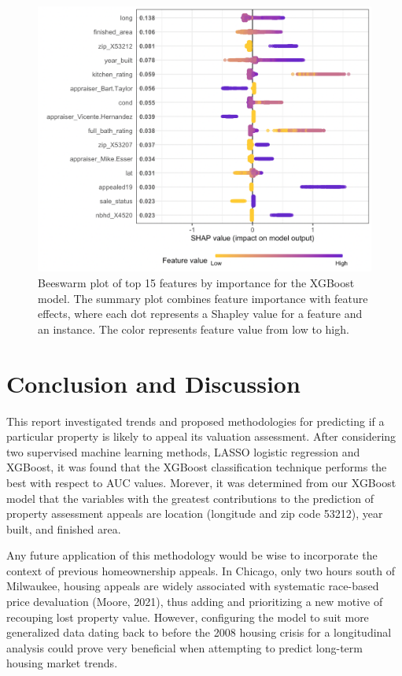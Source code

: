 \documentclass[
  12pt,
]{article}
\begin{document}
\begin{figure}[H]

{\centering \includegraphics[width=0.72\linewidth]{shapbees} 

}

\caption{Beeswarm plot of top 15 features by importance for the XGBoost model. The summary plot combines feature importance with feature effects, where each dot represents a Shapley value for a feature and an instance. The color represents feature value from low to high.}\label{fig:unnamed-chunk-9}
\end{figure}

\hypertarget{conclusion-and-discussion}{%
\section{Conclusion and Discussion}\label{conclusion-and-discussion}}

This report investigated trends and proposed methodologies for
predicting if a particular property is likely to appeal its valuation
assessment. After considering two supervised machine learning methods, LASSO logistic regression and XGBoost,
it was found that the XGBoost classification
technique performs the best with respect to AUC values. Morever, it was determined from our XGBoost model that 
the variables with the greatest contributions to the prediction of property assessment appeals are location (longitude and zip code 53212), year built, and finished area.

Any future application of this methodology would be wise to incorporate
the context of previous homeownership appeals. In Chicago, only two
hours south of Milwaukee, housing appeals are widely associated with
systematic race-based price devaluation (Moore, 2021), thus adding and
prioritizing a new motive of recouping lost property value. However,
configuring the model to suit more generalized data dating back to
before the 2008 housing crisis for a longitudinal analysis could prove
very beneficial when attempting to predict long-term housing market
trends.
\end{document}
